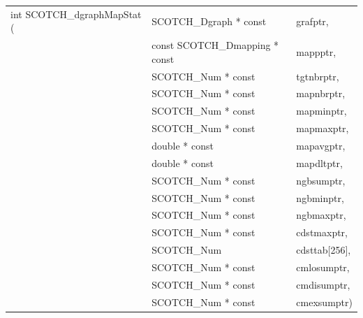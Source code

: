 \begin{itemize}
\progsyn

{\tt\begin{tabular}{l@{}ll}
int SCOTCH\_dgraphMapStat ( & SCOTCH\_Dgraph * const         & grafptr,      \\
                            & const SCOTCH\_Dmapping * const & mappptr,      \\
                            & SCOTCH\_Num * const            & tgtnbrptr,    \\
                            & SCOTCH\_Num * const            & mapnbrptr,    \\
                            & SCOTCH\_Num * const            & mapminptr,    \\
                            & SCOTCH\_Num * const            & mapmaxptr,    \\
                            & double * const                 & mapavgptr,    \\
                            & double * const                 & mapdltptr,    \\
                            & SCOTCH\_Num * const            & ngbsumptr,    \\
                            & SCOTCH\_Num * const            & ngbminptr,    \\
                            & SCOTCH\_Num * const            & ngbmaxptr,    \\
                            & SCOTCH\_Num * const            & cdstmaxptr,   \\
                            & SCOTCH\_Num                    & cdsttab[256], \\
                            & SCOTCH\_Num * const            & cmlosumptr,   \\
                            & SCOTCH\_Num * const            & cmdisumptr,   \\
                            & SCOTCH\_Num * const            & cmexsumptr)
\end{tabular}}


\end{itemize}

